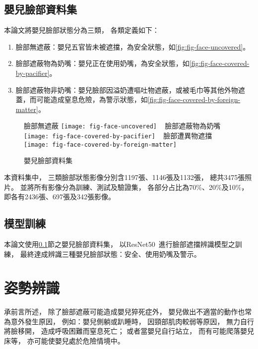 \documentclass[class=NCU_thesis, crop=false]{standalone}
\begin{document}
\subsection{嬰兒臉部資料集}
\label{sec:chapter_method_face_dataset}
本論文將嬰兒臉部狀態分為三類，
各類定義如下：
\begin{enumerate}
    \item 臉部無遮蔽：嬰兒五官皆未被遮擋，為安全狀態，如\cref{fig:fig-face-uncovered}。
    \item 臉部遮蔽物為奶嘴：嬰兒正在使用奶嘴，為安全狀態，如\cref{fig:fig-face-covered-by-pacifier}。
    \item 臉部遮蔽物非奶嘴：嬰兒臉部因溢奶遭嘔吐物遮蔽，或被毛巾等其他外物遮蓋，而可能造成窒息危險，為警示狀態，如\cref{fig:fig-face-covered-by-foreign-matter}。
\end{enumerate}
\begin{figure}[!hbt]
    \centering
    \subcaptionbox
        {臉部無遮蔽
        \label{fig:fig-face-uncovered}}
        {\texttt{[image: fig-face-uncovered]}}
    ~
    \subcaptionbox
        {臉部遮蔽物為奶嘴
        \label{fig:fig-face-covered-by-pacifier}}
        {\texttt{[image: fig-face-covered-by-pacifier]}}
    ~
    \subcaptionbox
        {臉部遭異物遮擋
        \label{fig:fig-face-covered-by-foreign-matter}}
        {\texttt{[image: fig-face-covered-by-foreign-matter]}}
    \caption{嬰兒臉部資料集}
    \label{fig:fig-face-dataset}
\end{figure}

本資料集中，
三類臉部狀態影像分別含1197張、1146張及1132張，
總共3475張照片。
並將所有影像分為訓練、測試及驗證集，
各部分占比為70\%、20\%及10\%，
即各有2436張、697張及342張影像。

\subsection{模型訓練}
本論文使用\ref{sec:chapter_method_face_dataset}節之嬰兒臉部資料集，
以ResNet50~\cite{he_deep_2016}進行臉部遮擋辨識模型之訓練，
最終達成辨識三種嬰兒臉部狀態：安全、使用奶嘴及警示。

\section{姿勢辨識}
\label{sec:chapter_method_posture}
承前言所述，
除了臉部遮蔽可能造成嬰兒猝死症外，
嬰兒做出不適當的動作也常為意外發生原因，
例如：嬰兒側躺或趴睡時，
因頸部肌肉較弱等原因，
無力自行將臉移開，
造成呼吸困難而窒息死亡；
或者當嬰兒自行站立，
而有可能爬落嬰兒床等，
亦可能使嬰兒處於危險情境中。
\end{document}
